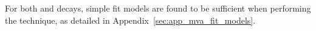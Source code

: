 For both \decay{\Bs}{\jpsi\phiz} and \decay{\Bsb}{\Dsp\pim} decays, simple fit models are found to be sufficient when performing the \sPlot technique, as detailed in Appendix~\ref{sec:app_mva_fit_models}.


